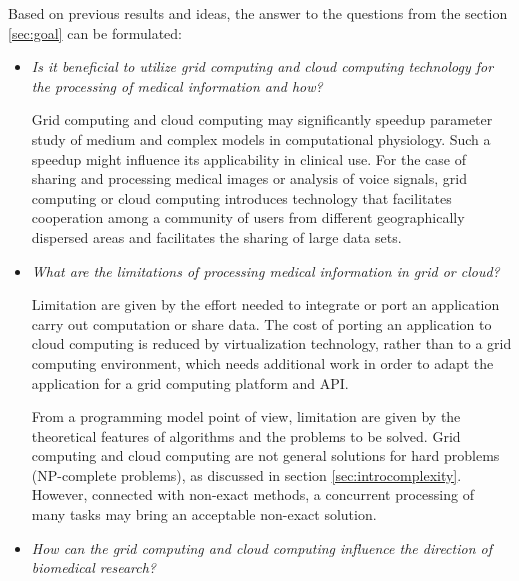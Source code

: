 Based on previous results and ideas, the answer to the questions from the section \ref{sec:goal} can be formulated:
\begin{itemize} 
\item \emph{Is it beneficial to utilize grid computing and cloud computing technology for the processing of medical information and how?}

Grid computing and cloud computing may significantly speedup parameter study of medium and complex models in computational physiology. Such a speedup might influence its applicability in clinical use. %
For the case of sharing and processing medical images or analysis of voice signals, grid computing or cloud computing introduces technology that facilitates cooperation among a community of users from different geographically dispersed areas and facilitates the sharing of large data sets.

\item \emph{What are the limitations of processing medical information in grid or cloud?}

Limitation are given by the effort needed to integrate or port an application carry out computation or share data. The cost of porting an application to cloud computing is reduced by virtualization technology, rather than to a grid computing environment, which needs additional work in order to adapt the application for a grid computing platform and API. 

From a programming model point of view, limitation are given by the theoretical features of algorithms and the problems to be solved. Grid computing and cloud computing are not general solutions for hard problems (NP-complete problems), as discussed in section \ref{sec:introcomplexity}. However, connected with non-exact methods, a concurrent processing of many tasks may bring an acceptable non-exact solution.

\item \emph{How can the grid computing and cloud computing influence the direction of biomedical research?}

 

\end{itemize}
